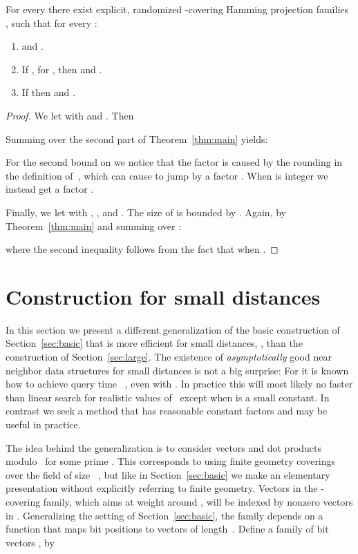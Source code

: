 \documentclass[prodmode,acmtalg]{acmsmall}
\begin{document}
\begin{corollary}\label{cor:params}
	For every  there exist explicit, randomized -covering Hamming projection families , 
	such that for every :
	\begin{enumerate}
		\item  and 
		.
		\item If , for , then  and .
		\item If  then  and 
		.
	\end{enumerate}
\end{corollary}
\begin{proof}
		We let  with  and . Then 

Summing over  the second part of Theorem~\ref{thm:main} yields: 


\medskip
		
		For the second bound on  we notice that the factor  is caused by the rounding in the definition of~, which can cause  to jump by a factor . When  is integer we instead get a factor .
		
\medskip
		
		Finally, we let  with , , and . The size of  is bounded by 
.
Again, by Theorem~\ref{thm:main} and summing over :

where the second inequality follows from the fact that  when . 
\end{proof}




\section{Construction for small distances}\label{sec:small-radius}

In this section we present a different generalization of the basic construction of Section~\ref{sec:basic} that is more efficient for small distances, , than the construction of Section~\ref{sec:large}.
The existence of \emph{asymptotically} good near neighbor data structures for small distances is not a big surprise: For  it is known how to achieve query time ~\cite{Cole:2004:DMI:1007352.1007374}, even with .
In practice this will most likely no faster than linear search for realistic values of~ except when  is a small constant.
In contrast we seek a method that has reasonable constant factors and may be useful in practice.

The idea behind the generalization is to consider vectors and dot products modulo~ for some prime .
This corresponds to using finite geometry coverings over the field of size ~\cite{gordon1995new}, but like in Section~\ref{sec:basic} we make an elementary presentation without explicitly referring to finite geometry.
Vectors in the -covering family, which aims at weight around , will be indexed by nonzero vectors in .
Generalizing the setting of Section~\ref{sec:basic}, the family depends on a function  that maps bit positions to vectors of length~. 
Define a family of bit vectors ,  by
\end{document}
